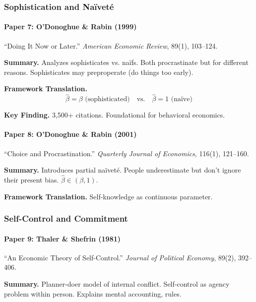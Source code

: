 \subsubsection{Sophistication and Naïveté}

\paragraph{Paper 7: O'Donoghue \& Rabin (1999)}

``Doing It Now or Later.''
\textit{American Economic Review}, 89(1), 103--124.

\textbf{Summary.}
Analyzes sophisticates vs. naïfs. Both procrastinate but for different 
reasons. Sophisticates may preproperate (do things too early).

\textbf{Framework Translation.}
\begin{equation}
\hat{\beta} = \beta \text{ (sophisticated)} \quad \text{vs.} \quad \hat{\beta} = 1 \text{ (naïve)}
\end{equation}

\textbf{Key Finding.}
3,500+ citations. Foundational for behavioral economics.

\paragraph{Paper 8: O'Donoghue \& Rabin (2001)}

``Choice and Procrastination.''
\textit{Quarterly Journal of Economics}, 116(1), 121--160.

\textbf{Summary.}
Introduces partial naïveté. People underestimate but don't ignore 
their present bias. $\hat{\beta} \in (\beta, 1)$.

\textbf{Framework Translation.}
Self-knowledge as continuous parameter.

\subsubsection{Self-Control and Commitment}

\paragraph{Paper 9: Thaler \& Shefrin (1981)}

``An Economic Theory of Self-Control.''
\textit{Journal of Political Economy}, 89(2), 392--406.

\textbf{Summary.}
Planner-doer model of internal conflict. Self-control as agency problem 
within person. Explains mental accounting, rules.

